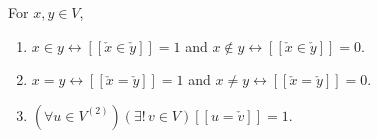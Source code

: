 For $x, y \in V$,
\begin{enumerate}
\item $x \in y \leftrightarrow [\![\check{x} \in \check{y}]\!] = 1$ and $x \notin y \leftrightarrow [\![\check{x} \in \check{y}]\!] = 0$.
\item $x = y \leftrightarrow [\![\check{x} = \check{y}]\!] = 1$ and $x \neq y \leftrightarrow [\![\check{x} = \check{y}]\!] = 0$.
\item $(\forall u \in V^{(2)}) (\exists!\, v \in V) [\![u = \check{v}]\!] = 1$.
\end{enumerate}
